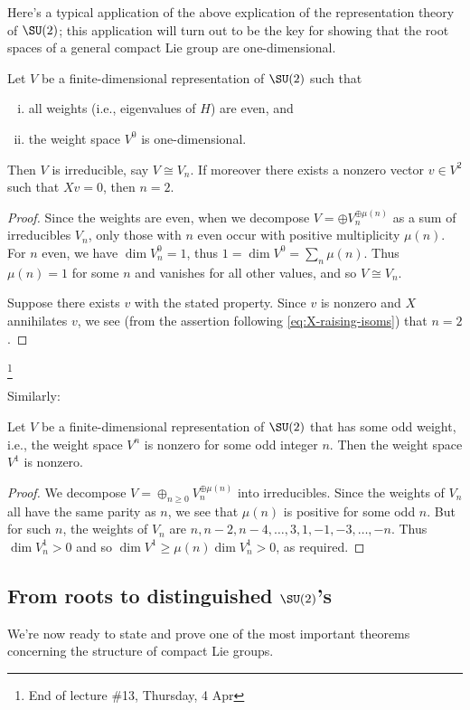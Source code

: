 \documentclass[reqno]{amsart} 
\begin{document}
Here's a typical application of the above explication of the representation theory of $\SU(2)$; this application will turn out to be the key for showing that the root spaces of a general compact Lie group are one-dimensional.
\begin{lemma}\label{lem:key-for-root-space-one-dimensional}
  Let $V$ be a finite-dimensional representation of $\SU(2)$ such that
  \begin{enumerate}
[(i)]
  \item all weights (i.e., eigenvalues of $H$) are even, and
  \item the weight space $V^0$ is one-dimensional.
  \end{enumerate}
  Then $V$ is irreducible, say $V \cong V_n$.  If moreover there exists a nonzero vector $v \in V^2$ such that $X v = 0$, then $n = 2$.
\end{lemma}
\begin{proof}
  Since the weights are even, when we decompose $V = \oplus V_n^{\oplus \mu(n)}$ as a sum of irreducibles $V_n$, only those with $n$ even occur with positive multiplicity $\mu(n)$.  For $n$ even, we have $\dim V_n^0 = 1$, thus $1 = \dim V^0 = \sum_n \mu(n)$.  Thus $\mu(n) = 1$ for some $n$ and vanishes for all other values, and so $V \cong V_n$.

  Suppose there exists $v$ with the stated property.  Since $v$ is nonzero and $X$ annihilates $v$, we see (from the assertion following \eqref{eq:X-raising-isoms}) that $n = 2$.
\end{proof}
\footnote{End of lecture \#13, Thursday, 4 Apr}

Similarly:
\begin{lemma}\label{lem:key-for-rational-multiples-of-roots}
  Let $V$ be a finite-dimensional representation of $\SU(2)$ that has some odd weight, i.e., the weight space $V^n$ is nonzero for some odd integer $n$.  Then the weight space $V^1$ is nonzero.
\end{lemma}
\begin{proof}
  We decompose $V = \oplus_{n \geq 0} V_n^{\oplus \mu(n)}$ into irreducibles.  Since the weights of $V_n$ all have the same parity as $n$, we see that $\mu(n)$ is positive for some odd $n$.  But for such $n$, the weights of $V_n$ are $n,n-2,n-4,\dotsc,3,1,-1,-3,\dotsc,-n$.  Thus $\dim V_n^1 > 0$ and so $\dim V^1 \geq \mu(n) \dim V_n^1 > 0$, as required.
\end{proof}

\subsection{From roots to distinguished \texorpdfstring{$\SU(2)$}{SU(2)}'s}\label{sec:from-roots-dist}
We're now ready to state and prove one of the most important theorems concerning the structure of compact Lie groups.
\end{document}
